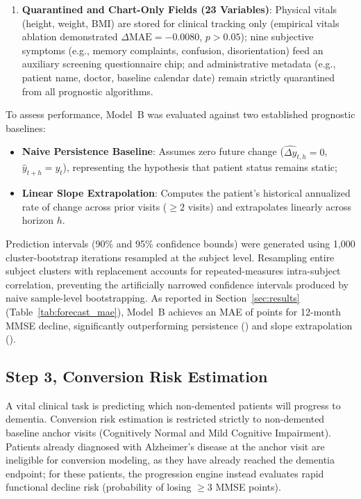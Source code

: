 \begin{enumerate}
    \item \textbf{Quarantined and Chart-Only Fields (23 Variables)}: Physical vitals (height, weight, BMI) are stored for clinical tracking only (empirical vitals ablation demonstrated $\Delta\text{MAE} = -0.0080$, $p > 0.05$); nine subjective symptoms (e.g., memory complaints, confusion, disorientation) feed an auxiliary screening questionnaire chip; and administrative metadata (e.g., patient name, doctor, baseline calendar date) remain strictly quarantined from all prognostic algorithms.
\end{enumerate}

To assess performance, Model~B was evaluated against two established prognostic baselines:
\begin{itemize}
    \item \textbf{Naive Persistence Baseline}: Assumes zero future change ($\widehat{\Delta y}_{t, h} = 0$, $\hat{y}_{t+h} = y_t$), representing the hypothesis that patient status remains static;
    \item \textbf{Linear Slope Extrapolation}: Computes the patient's historical annualized rate of change across prior visits ($\ge 2$ visits) and extrapolates linearly across horizon $h$.
\end{itemize}

Prediction intervals (90\% and 95\% confidence bounds) were generated using 1,000 cluster-bootstrap iterations resampled at the subject level. Resampling entire subject clusters with replacement accounts for repeated-measures intra-subject correlation, preventing the artificially narrowed confidence intervals produced by naive sample-level bootstrapping. As reported in Section~\ref{sec:results} (Table~\ref{tab:forecast_mae}), Model~B achieves an MAE of \MMSEMAEXII{} points for 12-month MMSE decline, significantly outperforming persistence (\MMSEPersistXII{}) and slope extrapolation (\MMSESlopeXII{}).

\subsection{Step 3, Conversion Risk Estimation}
A vital clinical task is predicting which non-demented patients will progress to dementia. Conversion risk estimation is restricted strictly to non-demented baseline anchor visits (Cognitively Normal and Mild Cognitive Impairment). Patients already diagnosed with Alzheimer's disease at the anchor visit are ineligible for conversion modeling, as they have already reached the dementia endpoint; for these patients, the progression engine instead evaluates rapid functional decline risk (probability of losing $\ge 3$ MMSE points).

